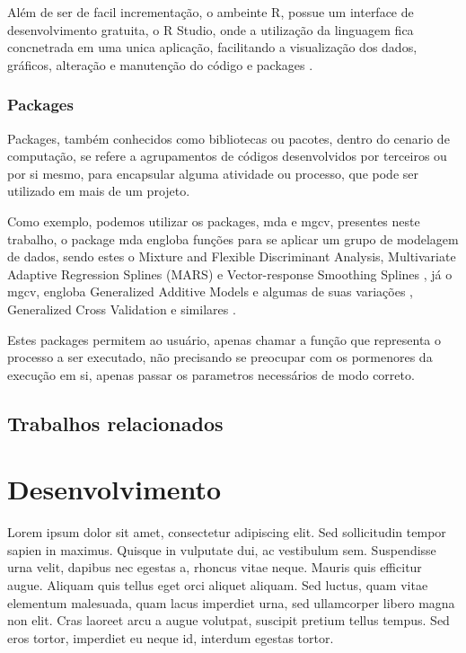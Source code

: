 \documentclass[
	12pt,				%
	openright,			%
	oneside,			%
	a4paper,			%
	english,			%
	brazil				%
	]{abntex2}
\begin{document}
Além de ser de facil incrementação, o ambeinte R, possue um interface de desenvolvimento gratuita, o R Studio, onde
a utilização da linguagem fica concnetrada em uma unica aplicação, facilitando a visualização dos dados, gráficos, alteração
e manutenção do código e packages \cite{rstudio}.

\subsection{Packages}

Packages, também conhecidos como bibliotecas ou pacotes, dentro do cenario de computação, se refere a agrupamentos de códigos
desenvolvidos por terceiros ou por si mesmo, para encapsular alguma atividade ou processo, que pode ser utilizado em mais
de um projeto.

Como exemplo, podemos utilizar os packages, mda e mgcv, presentes neste trabalho, o package mda engloba funções para se aplicar
um grupo de modelagem de dados, sendo estes o Mixture and Flexible Discriminant Analysis, Multivariate Adaptive Regression 
Splines (MARS) e Vector-response Smoothing Splines \cite{mda}, já o mgcv, engloba Generalized Additive Models e algumas de suas variações
, Generalized Cross Validation e similares \cite{mgcv}.

Estes packages permitem ao usuário, apenas chamar a função que representa o processo a ser executado, não precisando se preocupar com
os pormenores da execução em si, apenas passar os parametros necessários de modo correto.

\section{Trabalhos relacionados}



 \chapter{Desenvolvimento}

 Lorem ipsum dolor sit amet, consectetur adipiscing elit. Sed sollicitudin tempor sapien in maximus. Quisque in vulputate dui, ac vestibulum sem. Suspendisse urna velit, dapibus nec egestas a, rhoncus vitae neque. Mauris quis efficitur augue. Aliquam quis tellus eget orci aliquet aliquam. Sed luctus, quam vitae elementum malesuada, quam lacus imperdiet urna, sed ullamcorper libero magna non elit. Cras laoreet arcu a augue volutpat, suscipit pretium tellus tempus. Sed eros tortor, imperdiet eu neque id, interdum egestas tortor.
\end{document}
